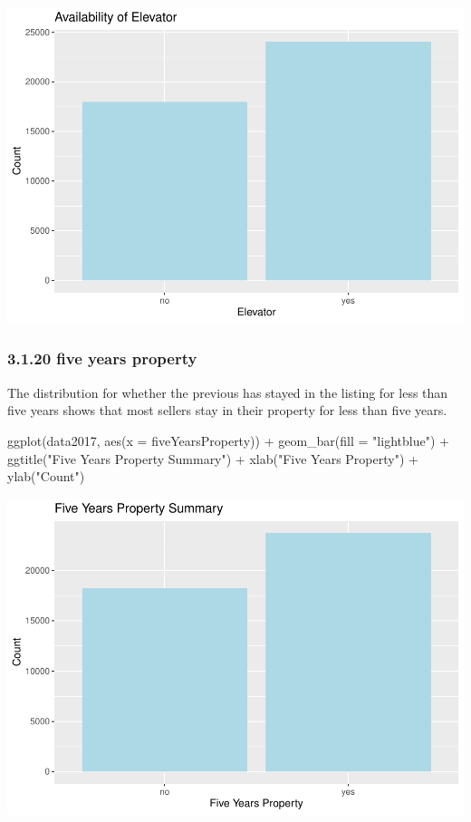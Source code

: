 \documentclass[
]{article}
\newenvironment{Shaded}{\begin{snugshade}}{\end{snugshade}}
\newcommand{\AttributeTok}[1]{\textcolor[rgb]{0.77,0.63,0.00}{#1}}
\newcommand{\FunctionTok}[1]{\textcolor[rgb]{0.00,0.00,0.00}{#1}}
\newcommand{\NormalTok}[1]{#1}
\newcommand{\SpecialCharTok}[1]{\textcolor[rgb]{0.00,0.00,0.00}{#1}}
\newcommand{\StringTok}[1]{\textcolor[rgb]{0.31,0.60,0.02}{#1}}
\begin{document}
\includegraphics{Project_files/figure-latex/unnamed-chunk-36-1.pdf}

\hypertarget{five-years-property}{%
\subsubsection{3.1.20 five years property}\label{five-years-property}}

The distribution for whether the previous has stayed in the listing for
less than five years shows that most sellers stay in their property for
less than five years.

\begin{Shaded}
\begin{Highlighting}[]
\FunctionTok{ggplot}\NormalTok{(data2017, }\FunctionTok{aes}\NormalTok{(}\AttributeTok{x =}\NormalTok{ fiveYearsProperty)) }\SpecialCharTok{+}
  \FunctionTok{geom\_bar}\NormalTok{(}\AttributeTok{fill =} \StringTok{"lightblue"}\NormalTok{) }\SpecialCharTok{+}
  \FunctionTok{ggtitle}\NormalTok{(}\StringTok{"Five Years Property Summary"}\NormalTok{) }\SpecialCharTok{+}
  \FunctionTok{xlab}\NormalTok{(}\StringTok{"Five Years Property"}\NormalTok{) }\SpecialCharTok{+}
  \FunctionTok{ylab}\NormalTok{(}\StringTok{"Count"}\NormalTok{)}
\end{Highlighting}
\end{Shaded}

\includegraphics{Project_files/figure-latex/unnamed-chunk-37-1.pdf}
\end{document}
